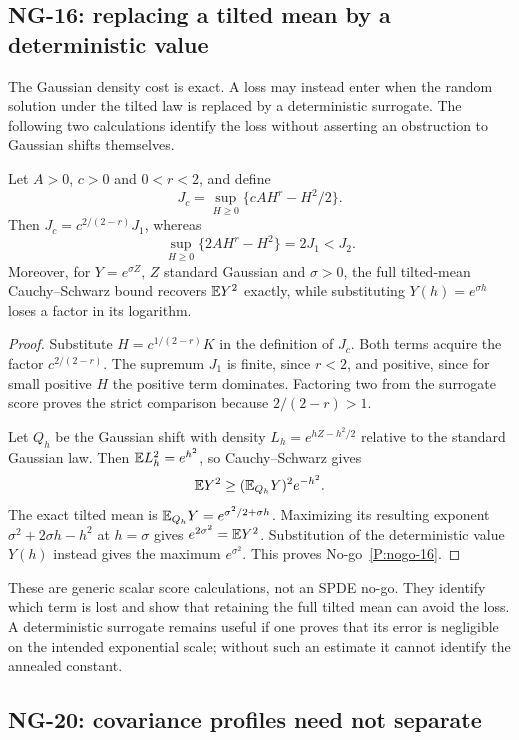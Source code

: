 \subsection{NG-16: replacing a tilted mean by a deterministic value}
\label{S:nogo-16}

The Gaussian density cost is exact. A loss may instead enter when the
random solution under the tilted law is replaced by a deterministic
surrogate. The following two calculations identify the loss without
asserting an obstruction to Gaussian shifts themselves.

\setcounter{nogo}{15}
\begin{nogo}
  \label{P:nogo-16}
  Let $A>0$, $c>0$ and $0<r<2$, and define
  \[
    J_c=\sup_{H\ge0}\{cAH^r-H^2/2\}.
  \]
  Then $J_c=c^{2/(2-r)}J_1$, whereas
  \[
    \sup_{H\ge0}\{2AH^r-H^2\}=2J_1<J_2.
  \]
  Moreover, for $Y=e^{\sigma Z}$, $Z$ standard Gaussian and $\sigma>0$,
  the full tilted-mean Cauchy--Schwarz bound recovers $\mathbb{E} Y^2$ exactly,
  while substituting $Y(h)=e^{\sigma h}$ loses a factor in its logarithm.
\end{nogo}
\begin{proof}
  Substitute $H=c^{1/(2-r)}K$ in the definition of $J_c$. Both terms
  acquire the factor $c^{2/(2-r)}$. The supremum $J_1$ is finite, since
  $r<2$, and positive, since for small positive $H$ the positive term
  dominates. Factoring two from the surrogate score proves the strict
  comparison because $2/(2-r)>1$.

  Let $Q_h$ be the Gaussian shift with density
  $L_h=e^{hZ-h^2/2}$ relative to the standard Gaussian law. Then
  $\mathbb{E} L_h^2=e^{h^2}$, so Cauchy--Schwarz gives
  \[
    \mathbb{E} Y^2\ge(\mathbb{E}_{Q_h}Y)^2e^{-h^2}.
  \]
  The exact tilted mean is $\mathbb{E}_{Q_h}Y=e^{\sigma^2/2+\sigma h}$.
  Maximizing its resulting exponent
  $\sigma^2+2\sigma h-h^2$ at $h=\sigma$ gives
  $e^{2\sigma^2}=\mathbb{E} Y^2$. Substitution of the deterministic value
  $Y(h)$ instead gives the maximum $e^{\sigma^2}$.
  This proves No-go~\ref{P:nogo-16}.
\end{proof}

These are generic scalar score calculations, not an SPDE no-go. They
identify which term is lost and show that retaining the full tilted mean
can avoid the loss. A deterministic surrogate remains useful if one
proves that its error is negligible on the intended exponential scale;
without such an estimate it cannot identify the annealed constant.

\subsection{NG-20: covariance profiles need not separate}
\label{S:nogo-20}

